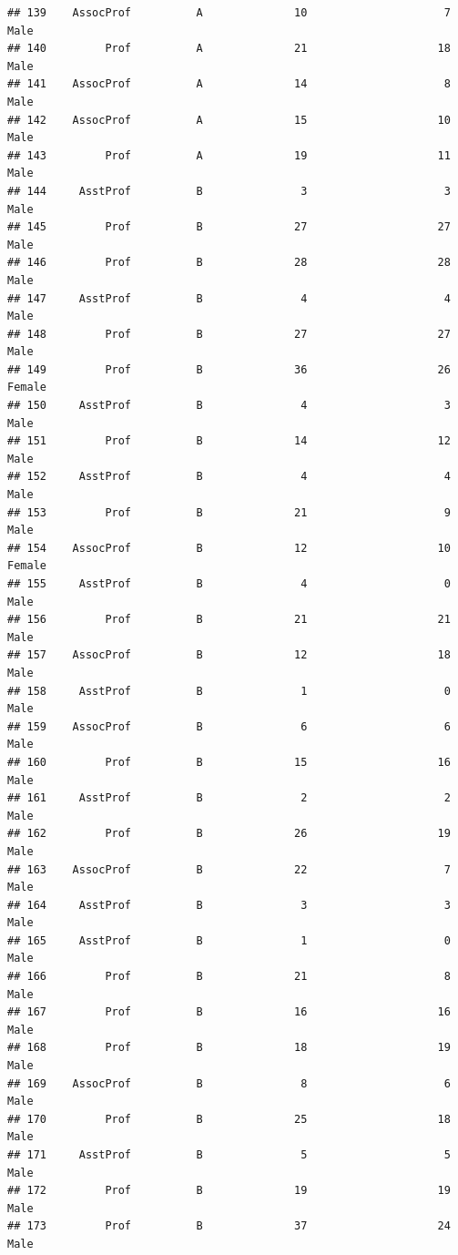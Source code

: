 \documentclass[]{article}
\begin{document}
\begin{verbatim}
## 139    AssocProf          A              10                     7   Male
## 140         Prof          A              21                    18   Male
## 141    AssocProf          A              14                     8   Male
## 142    AssocProf          A              15                    10   Male
## 143         Prof          A              19                    11   Male
## 144     AsstProf          B               3                     3   Male
## 145         Prof          B              27                    27   Male
## 146         Prof          B              28                    28   Male
## 147     AsstProf          B               4                     4   Male
## 148         Prof          B              27                    27   Male
## 149         Prof          B              36                    26 Female
## 150     AsstProf          B               4                     3   Male
## 151         Prof          B              14                    12   Male
## 152     AsstProf          B               4                     4   Male
## 153         Prof          B              21                     9   Male
## 154    AssocProf          B              12                    10 Female
## 155     AsstProf          B               4                     0   Male
## 156         Prof          B              21                    21   Male
## 157    AssocProf          B              12                    18   Male
## 158     AsstProf          B               1                     0   Male
## 159    AssocProf          B               6                     6   Male
## 160         Prof          B              15                    16   Male
## 161     AsstProf          B               2                     2   Male
## 162         Prof          B              26                    19   Male
## 163    AssocProf          B              22                     7   Male
## 164     AsstProf          B               3                     3   Male
## 165     AsstProf          B               1                     0   Male
## 166         Prof          B              21                     8   Male
## 167         Prof          B              16                    16   Male
## 168         Prof          B              18                    19   Male
## 169    AssocProf          B               8                     6   Male
## 170         Prof          B              25                    18   Male
## 171     AsstProf          B               5                     5   Male
## 172         Prof          B              19                    19   Male
## 173         Prof          B              37                    24   Male

\end{verbatim}
\end{document}
